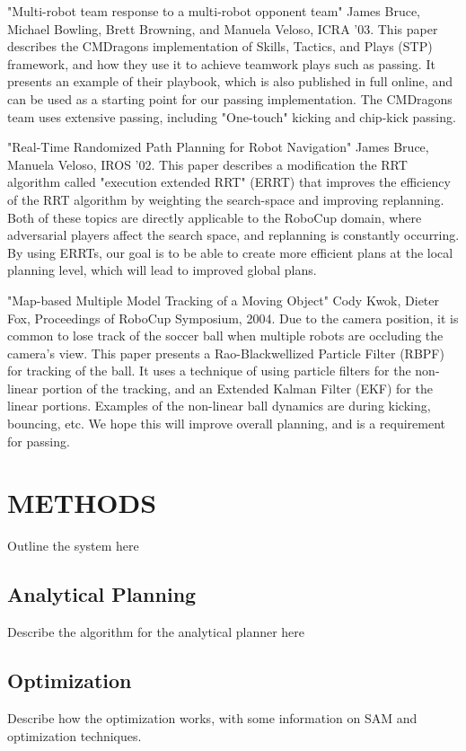 \documentclass[a4paper, 10pt, conference]{ieeeconf}      %
\begin{document}
"Multi-robot team response to a multi-robot opponent team" James Bruce, Michael Bowling, Brett Browning, and Manuela Veloso, ICRA '03. This paper describes the CMDragons implementation of Skills, Tactics, and Plays (STP) framework, and how they use it to achieve teamwork plays such as passing. It presents an example of their playbook, which is also published in full online, and can be used as a starting point for our passing implementation. The CMDragons team uses extensive passing, including "One-touch" kicking and chip-kick passing.

"Real-Time Randomized Path Planning for Robot Navigation" James Bruce, Manuela Veloso, IROS '02. This paper describes a modification the RRT algorithm called "execution extended RRT" (ERRT) that improves the efficiency of the RRT algorithm by weighting the search-space and improving replanning. Both of these topics are directly applicable to the RoboCup domain, where adversarial players affect the search space, and replanning is constantly occurring. By using ERRTs, our goal is to be able to create more efficient plans at the local planning level, which will lead to improved global plans.

"Map-based Multiple Model Tracking of a Moving Object" Cody Kwok, Dieter Fox, Proceedings of RoboCup Symposium, 2004. Due to the camera position, it is common to lose track of the soccer ball when multiple robots are occluding the camera's view. This paper presents a Rao-Blackwellized Particle Filter (RBPF) for tracking of the ball. It uses a technique of using particle filters for the non-linear portion of the tracking, and an Extended Kalman Filter (EKF) for the linear portions. Examples of the non-linear ball dynamics are during kicking, bouncing, etc. We hope this will improve overall planning, and is a requirement for passing.


\section{METHODS}
Outline the system here

\subsection{Analytical Planning}
Describe the algorithm for the analytical planner here

\subsection{Optimization}
Describe how the optimization works, with some information on SAM\cite{Dellaert05rss} and optimization techniques.  
\end{document}
